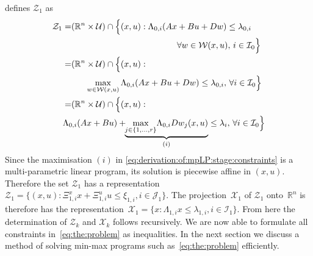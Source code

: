 \documentclass{ifacconf}
\begin{document}
defines $\mathcal Z_1$ as
\begin{equation}\label{eq:derivation:of:mpLP:stage:constraints}
\begin{aligned}
	\mathcal Z_1 =& (\mathbb R^n\times\mathcal U)\cap 
\begin{aligned}[t] \Bigl\{(x,u): \Lambda_{0,i}(Ax&+Bu+Dw)\leq \lambda_{0,i} \\
& \forall w\in\mathcal W(x,u),\, i\in\mathcal I_0 \Bigr\} \end{aligned}
\\
	=&\begin{aligned}[t] (\mathbb R^n & \times \mathcal U) \cap\Bigl\{ (x,u): \\
& \max_{w\in\mathcal W(x,u)}\Lambda_{0,i}(Ax+Bu+Dw)\leq\lambda_{0,i},\, \forall i\in\mathcal I_0 \Bigr\} \end{aligned}
\\
	=&\begin{aligned}[t] & (\mathbb R^n \times\mathcal U)\cap \Bigl\{ (x,u): \\
& \!\!\!\!\!\!
\Lambda_{0,i}(Ax+Bu)+ \!\!\underbrace{\max_{j\in\{1,\dots,r\}}\!\Lambda_{0,i} Dw_j(x,u)}_{(i)}\leq\lambda_i, \, \forall i\in\mathcal I_0
	\Bigr\} \end{aligned}
\end{aligned}
\end{equation}
Since the maximisation $(i)$ in \eqref{eq:derivation:of:mpLP:stage:constraints} is a multi-parametric
linear program, its solution is piecewise affine in $(x,u)$. 
Therefore the set $\mathcal Z_1$ has a representation
$\mathcal Z_1=\{(x,u):\Xi^x_{1,i}x+\Xi^u_{1,i}u\leq\xi_{1,i},i\in\mathcal J_1\}$. The projection~$\mathcal X_1$ 
of $\mathcal Z_1$ onto~$\mathbb R^n$ is therefore has the representation~$\mathcal X_1 = \{x:\Lambda_{1,i} x\leq\lambda_{1,i},i\in\mathcal I_1\}$.
From here the determination of $\mathcal Z_k$ and $\mathcal X_k$ follows recursively. We are now able to formulate 
all constraints in~\eqref{eq:the:problem} as inequalities. In the next section we discuss a method of solving
min-max programs such as~\eqref{eq:the:problem} efficiently.
\end{document}
